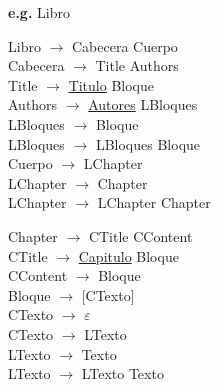 \documentclass[\main/ApuntesPL.tex]{subfiles}
\begin{document}
      \par
      \textbf{e.g.} Libro\\
      \begin{center}
        \begin{minipage}{.5\textwidth}
          \hspace*{5mm}Libro $\rightarrow$ Cabecera Cuerpo\\
          \hspace*{5mm}Cabecera $\rightarrow$ Title Authors\\
          \hspace*{5mm}Title $\rightarrow$ \underline{Titulo} Bloque\\
          \hspace*{5mm}Authors $\rightarrow$ \underline{Autores} LBloques\\
          \hspace*{5mm}LBloques $\rightarrow$ Bloque\\
          \hspace*{5mm}LBloques $\rightarrow$ LBloques Bloque\\
          \hspace*{5mm}Cuerpo $\rightarrow$ LChapter\\
          \hspace*{5mm}LChapter $\rightarrow$ Chapter\\
          \hspace*{5mm}LChapter $\rightarrow$ LChapter Chapter\\
        \end{minipage}%
        \begin{minipage}{.5\textwidth}
          \hspace*{5mm}Chapter $\rightarrow$ CTitle CContent\\
          \hspace*{5mm}CTitle $\rightarrow$ \underline{Capitulo} Bloque\\
          \hspace*{5mm}CContent $\rightarrow$ Bloque\\
          \hspace*{5mm}Bloque $\rightarrow$ $[$CTexto$]$\\
          \hspace*{5mm}CTexto $\rightarrow$ $\varepsilon$\\
          \hspace*{5mm}CTexto $\rightarrow$ LTexto\\
          \hspace*{5mm}LTexto $\rightarrow$ Texto\\
          \hspace*{5mm}LTexto $\rightarrow$ LTexto Texto\\
        \end{minipage}
      \end{center}
\end{document}

